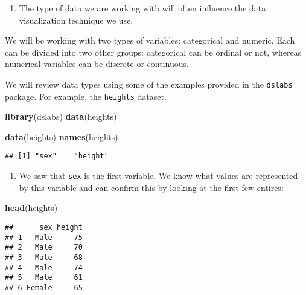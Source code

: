 \documentclass[]{article}
\newenvironment{Shaded}{\begin{snugshade}}{\end{snugshade}}
\newcommand{\KeywordTok}[1]{\textcolor[rgb]{0.13,0.29,0.53}{\textbf{#1}}}
\newcommand{\NormalTok}[1]{#1}
\providecommand{\tightlist}{%
  \setlength{\itemsep}{0pt}\setlength{\parskip}{0pt}}
\begin{document}
\begin{enumerate}
\def\labelenumi{\arabic{enumi}.}
\tightlist
\item
  The type of data we are working with will often influence the data
  visualization technique we use.
\end{enumerate}

We will be working with two types of variables: categorical and numeric.
Each can be divided into two other groups: categorical can be ordinal or
not, whereas numerical variables can be discrete or continuous.

We will review data types using some of the examples provided in the
\texttt{dslabs} package. For example, the \texttt{heights} dataset.

\begin{Shaded}
\begin{Highlighting}[]
\KeywordTok{library}\NormalTok{(dslabs)}
\KeywordTok{data}\NormalTok{(heights)}
\end{Highlighting}
\end{Shaded}

\begin{Shaded}
\begin{Highlighting}[]
\KeywordTok{data}\NormalTok{(heights)}
\KeywordTok{names}\NormalTok{(heights)}
\end{Highlighting}
\end{Shaded}

\begin{verbatim}
## [1] "sex"    "height"
\end{verbatim}

\begin{enumerate}
\def\labelenumi{\arabic{enumi}.}
\setcounter{enumi}{1}
\tightlist
\item
  We saw that \texttt{sex} is the first variable. We know what values
  are represented by this variable and can confirm this by looking at
  the first few entires:
\end{enumerate}

\begin{Shaded}
\begin{Highlighting}[]
\KeywordTok{head}\NormalTok{(heights)}
\end{Highlighting}
\end{Shaded}

\begin{verbatim}
##      sex height
## 1   Male     75
## 2   Male     70
## 3   Male     68
## 4   Male     74
## 5   Male     61
## 6 Female     65
\end{verbatim}
\end{document}

